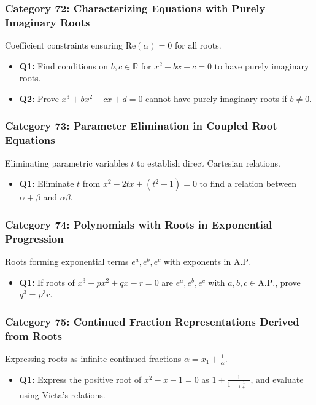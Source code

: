 \documentclass[10pt,a4paper]{article}
\begin{document}
\subsubsection{Category 72: Characterizing Equations with Purely Imaginary Roots}
Coefficient constraints ensuring $\text{Re}(\alpha) = 0$ for all roots.
\begin{itemize}[leftmargin=*]
    \item \textbf{Q1:} Find conditions on $b, c \in \mathbb{R}$ for $x^2 + bx + c = 0$ to have purely imaginary roots.
    \item \textbf{Q2:} Prove $x^3 + bx^2 + cx + d = 0$ cannot have purely imaginary roots if $b \neq 0$.
\end{itemize}

\subsubsection{Category 73: Parameter Elimination in Coupled Root Equations}
Eliminating parametric variables $t$ to establish direct Cartesian relations.
\begin{itemize}[leftmargin=*]
    \item \textbf{Q1:} Eliminate $t$ from $x^2 - 2tx + (t^2 - 1) = 0$ to find a relation between $\alpha+\beta$ and $\alpha\beta$.
\end{itemize}

\subsubsection{Category 74: Polynomials with Roots in Exponential Progression}
Roots forming exponential terms $e^a, e^b, e^c$ with exponents in A.P.
\begin{itemize}[leftmargin=*]
    \item \textbf{Q1:} If roots of $x^3 - px^2 + qx - r = 0$ are $e^a, e^b, e^c$ with $a,b,c \in \text{A.P.}$, prove $q^3 = p^3 r$.
\end{itemize}

\subsubsection{Category 75: Continued Fraction Representations Derived from Roots}
Expressing roots as infinite continued fractions $\alpha = x_1 + \frac{1}{\alpha}$.
\begin{itemize}[leftmargin=*]
    \item \textbf{Q1:} Express the positive root of $x^2 - x - 1 = 0$ as $1 + \frac{1}{1 + \frac{1}{1 + \dots}}$, and evaluate using Vieta's relations.
\end{itemize}
\end{document}
